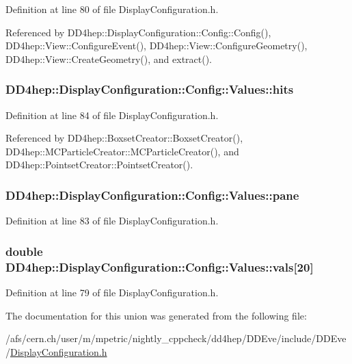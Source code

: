 Definition at line 80 of file DisplayConfiguration.h.

Referenced by DD4hep::DisplayConfiguration::Config::Config(), DD4hep::View::ConfigureEvent(), DD4hep::View::ConfigureGeometry(), DD4hep::View::CreateGeometry(), and extract().\hypertarget{union_d_d4hep_1_1_display_configuration_1_1_config_1_1_values_ab649c49cff98283b0349025bb35e329a}{
\subsubsection[{hits}]{ {\bf DD4hep::DisplayConfiguration::Config::Values::hits}}}
\label{union_d_d4hep_1_1_display_configuration_1_1_config_1_1_values_ab649c49cff98283b0349025bb35e329a}


Definition at line 84 of file DisplayConfiguration.h.

Referenced by DD4hep::BoxsetCreator::BoxsetCreator(), DD4hep::MCParticleCreator::MCParticleCreator(), and DD4hep::PointsetCreator::PointsetCreator().\hypertarget{union_d_d4hep_1_1_display_configuration_1_1_config_1_1_values_af61c2a6b0a332acd9edf8e8387e8fd0c}{
\subsubsection[{pane}]{ {\bf DD4hep::DisplayConfiguration::Config::Values::pane}}}
\label{union_d_d4hep_1_1_display_configuration_1_1_config_1_1_values_af61c2a6b0a332acd9edf8e8387e8fd0c}


Definition at line 83 of file DisplayConfiguration.h.\hypertarget{union_d_d4hep_1_1_display_configuration_1_1_config_1_1_values_aba0dbc907603e0decb003ec889e684b9}{
\subsubsection[{vals}]{\setlength{\rightskip}{0pt plus 5cm}double {\bf DD4hep::DisplayConfiguration::Config::Values::vals}\mbox{[}20\mbox{]}}}
\label{union_d_d4hep_1_1_display_configuration_1_1_config_1_1_values_aba0dbc907603e0decb003ec889e684b9}


Definition at line 79 of file DisplayConfiguration.h.

The documentation for this union was generated from the following file:\begin{DoxyCompactItemize}
\item 
/afs/cern.ch/user/m/mpetric/nightly\_\-cppcheck/dd4hep/DDEve/include/DDEve/\hyperlink{_display_configuration_8h}{DisplayConfiguration.h}\end{DoxyCompactItemize}
